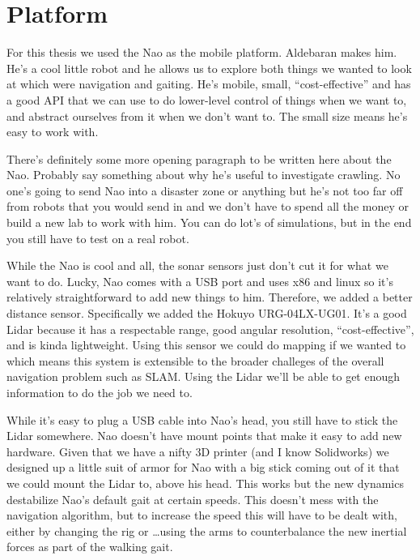 
\chapter{Platform}\label{ch:platform}

For this thesis we used the Nao as the mobile platform. Aldebaran makes him.
He's a cool little robot and he allows us to explore both things we wanted to 
look at which were navigation and gaiting. He's mobile, small, ``cost-effective''
and has a good API that we can use to do lower-level control of things when we want to, 
and abstract ourselves from it when we don't want to.
The small size means he's easy to work with.

There's definitely some more opening paragraph to be written here about the Nao.
Probably say something about why he's useful to investigate crawling.
No one's going to send Nao into a disaster zone or anything but he's not too
far off from robots that you would send in and we don't have to spend all the 
money or build a new lab to work with him. You can do lot's of simulations, 
but in the end you still have to test on a real robot.

While the Nao is cool and all, the sonar sensors just don't cut it for what we want to do.
Lucky, Nao comes with a USB port and uses x86 and linux so it's relatively
straightforward to add new things to him. Therefore, we added a better distance sensor.
Specifically we added the Hokuyo URG-04LX-UG01.
It's a good Lidar because it has a respectable range, good angular resolution,
``cost-effective'', and is kinda lightweight. Using this sensor we could do mapping 
if we wanted to which means this system is extensible to the broader challeges 
of the overall navigation problem such as SLAM\@. Using the Lidar we'll be able to 
get enough information to do the job we need to.

While it's easy to plug a USB cable into Nao's head, you still have to stick the Lidar somewhere.
Nao doesn't have mount points that make it easy to add new hardware.
Given that we have a nifty 3D printer (and I know Solidworks) we designed up a little suit of
armor for Nao with a big stick coming out of it that we could mount the Lidar to, above his head.
This works but the new dynamics destabilize Nao's default gait at certain speeds. 
This doesn't mess with the navigation algorithm, but to increase the speed this will have to be dealt with,
either by changing the rig or \ldots using the arms to counterbalance the new inertial forces as
part of the walking gait.


